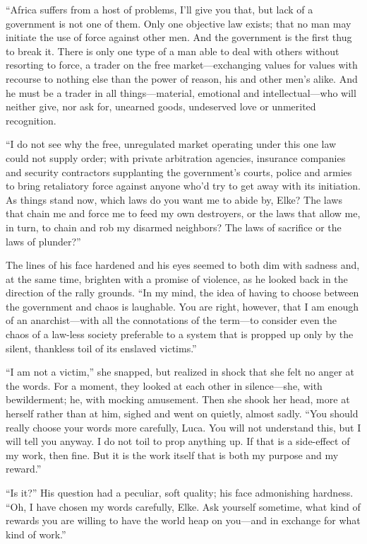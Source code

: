 ``Africa suffers from a host of problems, I'll give you that, but lack of a government is not one of them. Only one objective law exists; that no man may initiate the use of force against other men. And the government is the first thug to break it. There is only one type of a man able to deal with others without resorting to force, a trader on the free market---exchanging values for values with recourse to nothing else than the power of reason, his and other men's alike. And he must be a trader in all things---material, emotional and intellectual---who will neither give, nor ask for, unearned goods, undeserved love or unmerited recognition.

``I do not see why the free, unregulated market operating under this one law could not supply order; with private arbitration agencies, insurance companies and security contractors supplanting the government's courts, police and armies to bring retaliatory force against anyone who'd try to get away with its initiation. As things stand now, which laws do you want me to abide by, Elke? The laws that chain me and force me to feed my own destroyers, or the laws that allow me, in turn, to chain and rob my disarmed neighbors? The laws of sacrifice or the laws of plunder?''

The lines of his face hardened and his eyes seemed to both dim with sadness and, at the same time, brighten with a promise of violence, as he looked back in the direction of the rally grounds. ``In my mind, the idea of having to choose between the government and chaos is laughable. You are right, however, that I am enough of an anarchist---with all the connotations of the term---to consider even the chaos of a law-less society preferable to a system that is propped up only by the silent, thankless toil of its enslaved victims.''

``I am not a victim,'' she snapped, but realized in shock that she felt no anger at the words. For a moment, they looked at each other in silence---she, with bewilderment; he, with mocking amusement. Then she shook her head, more at herself rather than at him, sighed and went on quietly, almost sadly. ``You should really choose your words more carefully, Luca. You will not understand this, but I will tell you anyway. I do not toil to prop anything up. If that is a side-effect of my work, then fine. But it is the work itself that is both my purpose and my reward.''

``Is it?'' His question had a peculiar, soft quality; his face admonishing hardness. ``Oh, I have chosen my words carefully, Elke. Ask yourself sometime, what kind of rewards you are willing to have the world heap on you---and in exchange for what kind of work.''

